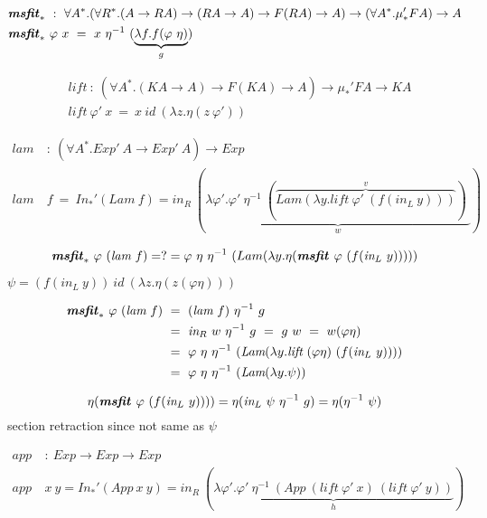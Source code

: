 \documentclass[a4paper,UKenglish]{lipics}
\newcommand{\msfit}[1]{\ensuremath{\textbf{\textit{msfit}}_{#1}}}
\newcommand{\lift}[0]{\textit{lift}}
\newcommand{\In}[1]{\textit{In}_{#1}}
\newcommand{\inL}[0]{\textit{in}_{L}}
\newcommand{\inR}[0]{\textit{in}_{R}}
\begin{document}
\begin{align*}
&\msfit{*} ~:~ \forall A^{*}.
	(\forall R^{*}.(A \to R A) \to (R A \to A) \to F(R A) \to A) \to
	(\forall A^{*}.\mu_{*}' F A) \to A \\
&\msfit{*}~\varphi~x ~=~ x~\eta^{-1}~(\underbrace{\lambda f.f(\varphi~\eta)}_g)
\end{align*}

\begin{align*}
& \lift~:~(\forall A^{*}.(K A\to A)\to F(K A)\to A)\to \mu_{*}' F A\to K A\\
& \lift~\varphi'~x ~=~ x~\textit{id}~(\lambda z.\eta(z~\varphi'))
\end{align*}




\begin{align*}
\textit{lam}&~:~(\forall A^{*}.\textit{Exp}'~A \to \textit{Exp}'~A) \to
		\textit{Exp} \\
\textit{lam}&~f~=~\In{*}'(\textit{Lam}~f)
= \inR~(\underbrace{
	\lambda \varphi'.\varphi'~\eta^{-1}~
	(\overbrace{\textit{Lam}(\lambda y.\textit{lift}~\varphi'~(f(\inL~y))) }^v)\;
	}_w)
\end{align*}

\[
\msfit{*}~\varphi~(\textit{lam}~f)
=?= \varphi~\eta~\eta^{-1}~(Lam(\lambda y.\eta(\msfit~\varphi~(f(\inL~y)))))
\]

$\psi = (f(\inL~y))~\textit{id}~(\lambda z.\eta(z(\varphi\eta)))$

\begin{align*}
\msfit{*}~\varphi~(\textit{lam}~f)
&~=~ (\textit{lam}~f)~\eta^{-1}~g \\
&~=~ \inR~w~\eta^{-1}~g ~=~ g~w ~=~ w(\varphi\eta) \\
&~=~ \varphi~\eta~\eta^{-1}~
	(\textit{Lam}(\lambda y.\lift~(\varphi\eta)~(f(\inL~y)))) \\
&~=~ \varphi~\eta~\eta^{-1}~(\textit{Lam}(\lambda y.\psi))
\end{align*}

\[ \eta(\msfit~\varphi~(f(\inL~y)))) = \eta(\inL~\psi~\eta^{-1}~g)
	= \eta(\eta^{-1}~\psi)
\]
section retraction since not same as $\psi$


\begin{align*}
\textit{app} &~:~ \textit{Exp} \to \textit{Exp} \to \textit{Exp} \\
\textit{app} &~ x~y = \In{*}'(\textit{App}~x~y)
= \inR~(\underbrace{\lambda \varphi'.\varphi'~\eta^{-1}~
			(\textit{App}~(\lift~\varphi'~x)~(\lift~\varphi'~y))}_h)
\end{align*}
\end{document}
